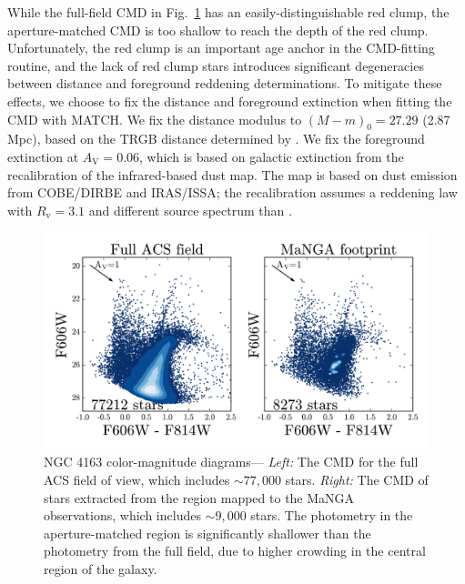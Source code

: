 \documentclass[preprint2]{aastex62}
\newcommand{\Av}{\ensuremath{A_{\mathrm{V}}}\xspace}
\newcommand{\dmod}{\ensuremath{(M - m)_0}\xspace}
\begin{document}
While the full-field CMD in Fig.~\ref{fig:cmd} has an easily-distinguishable red clump, the aperture-matched CMD is too shallow to reach the depth of the red clump. Unfortunately, the red clump is an important age anchor in the CMD-fitting routine, and the lack of red clump stars introduces significant degeneracies between distance and foreground reddening determinations. To mitigate these effects, we choose to fix the distance and foreground extinction when fitting the CMD with MATCH. We fix the distance modulus to $\dmod = 27.29$ (2.87\,Mpc), based on the TRGB distance determined by \citet{Dalcanton+2009}. We fix the foreground extinction at $\Av=0.06$, which is based on galactic extinction from the \citet{Schlafly+2011} recalibration of the \citet{Schlegel+1998} infrared-based dust map. The map is based on dust emission from COBE/DIRBE and IRAS/ISSA; the recalibration assumes a \citet{Fitzpatrick+1999} reddening law with $R_{\mathrm{v}} = 3.1$ and different source spectrum than \citet{Schlegel+1998}.

\begin{figure}
  \begin{center}
    \includegraphics[width=\linewidth]{figs/f2.png}
    \caption{{\sc NGC 4163 color-magnitude diagrams---} \emph{Left:} The CMD for the full ACS field of view, which includes ${\sim}77,000$ stars. \emph{Right: } The CMD of stars extracted from the region mapped to the MaNGA observations, which includes ${\sim}9,000$ stars. The photometry in the aperture-matched region is significantly shallower than the photometry from the full field, due to higher crowding in the central region of the galaxy.}
    \label{fig:cmd}
  \end{center}
\end{figure}
\end{document}
